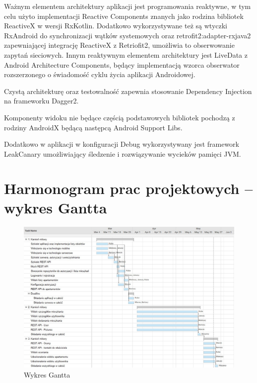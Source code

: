 \documentclass[polish, 11pt]{article}
\begin{document}
    	Ważnym elementem architektury aplikacji jest programowania reaktywne, w tym celu użyto implementacji Reactive Components znanych jako rodzina bibliotek ReactiveX w wersji RxKotlin. Dodatkowo wykorzystywane też są wtyczki RxAndroid do synchronizacji wątków systemowych oraz retrofit2:adapter-rxjava2 zapewniającej integrację ReactiveX z Retriofit2, umożliwia to obserwowanie zapytań sieciowych. Innym reaktywnym elementem architektury jest LiveData z Android Architecture Components, będący implementacją wzorca obserwator rozszerzonego o świadomość cyklu życia aplikacji Androidowej.
    	
    	Czystą architekturę oraz testowalność zapewnia stosowanie Dependency Injection na frameworku Dagger2.
    	
    	Komponenty widoku nie będące częścią podstawowych bibliotek pochodzą z rodziny AndroidX będącą następcą Android Support Libs.
    	
    	Dodatkowo w aplikacji w konfiguracji Debug wykorzystywany jest framework LeakCanary umożliwiający śledzenie i rozwiązywanie wycieków pamięci JVM. 

\section{Harmonogram prac projektowych – wykres Gantta}
    \begin{figure}[H]
        \centering
        \includegraphics[width=\textwidth]{figures/gantt.jpg}
        \caption{Wykres Gantta}
    \end{figure}
    
\end{document}
